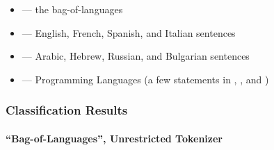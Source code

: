 \begin{itemize}
\item
{} --- the bag-of-languages

\item
{} --- English, French, Spanish, and Italian sentences

\item
{} --- Arabic, Hebrew, Russian, and Bulgarian sentences

\item
{} --- Programming Languages (a few statements in {\cpp}, {\java}, and {\perl})
\end{itemize}



\subsubsection{Classification Results}
\label{sect:lang-classification-results}

\paragraph{``Bag-of-Languages'', Unrestricted Tokenizer}


